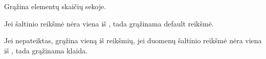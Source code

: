 \documentclass[letterpaper,10pt,lithuanian]{sphinxmanual}
\begin{document}
\begin{fulllineitems}
\begin{fulllineitems}
\label{\detokenize{formules:func.len}}
\pysigstartsignatures
{}
\pysigstopsignatures
\sphinxAtStartPar
Grąžina elementų skaičių sekoje.

\end{fulllineitems}


\begin{fulllineitems}
\label{\detokenize{formules:func.choose}}
\pysigstartsignatures
{}
\pysigstopsignatures
\sphinxAtStartPar
Jei šaltinio reikšmė nėra viena iš {\hyperref[\detokenize{dimensijos:enum}]{}}, tada grąžinama default
reikšmė.

\sphinxAtStartPar
Jei  nepateiktas, grąžina vieną iš {\hyperref[\detokenize{dimensijos:property.enum}]{}}
reikšmių, jei duomenų šaltinio reikšmė nėra viena iš
{\hyperref[\detokenize{dimensijos:property.enum}]{}}, tada grąžinama klaida.

\end{fulllineitems}


\begin{fulllineitems}
\label{\detokenize{formules:func.switch}}
\pysigstartsignatures
{}
\pysigstopsignatures
\end{fulllineitems}


\begin{fulllineitems}
\label{\detokenize{formules:func.case}}
\pysigstartsignatures
{}
\pysigstopsignatures
\end{fulllineitems}


\end{fulllineitems}
\end{document}
